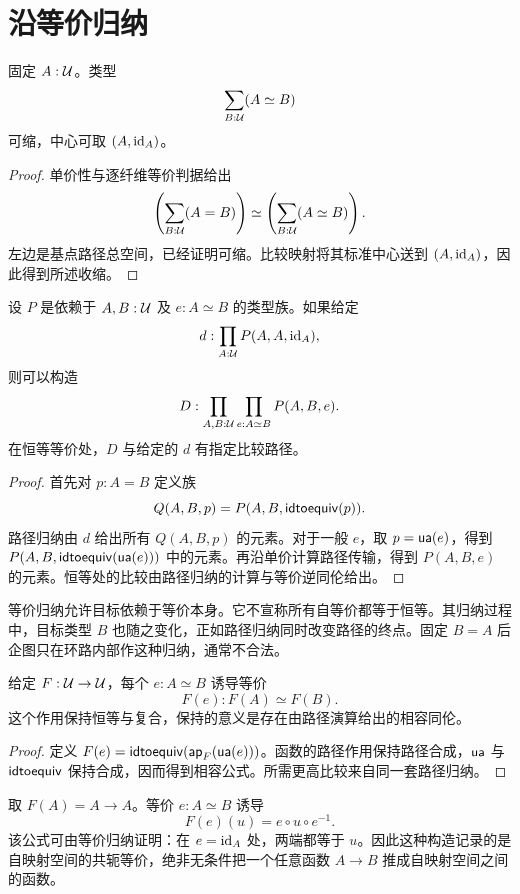 \section{沿等价归纳}
\begin{lemma}[等价总空间可缩]
固定 $A:\mathcal U$。类型
\[
\sum_{B:\mathcal U}(A\simeq B)
\]
可缩，中心可取 $(A,\operatorname{id}_A)$。
\end{lemma}
\begin{proof}
单价性与逐纤维等价判据给出
\[
\left(\sum_{B:\mathcal U}(A=B)\right)
\simeq
\left(\sum_{B:\mathcal U}(A\simeq B)\right).
\]
左边是基点路径总空间，已经证明可缩。比较映射将其标准中心送到 $(A,\operatorname{id}_A)$，因此得到所述收缩。
\end{proof}
\begin{theorem}[等价归纳]
设 $P$ 是依赖于 $A,B:\mathcal U$ 及 $e:A\simeq B$ 的类型族。如果给定
\[
 d:\prod_{A:\mathcal U}P(A,A,\operatorname{id}_A),
\]
则可以构造
\[
 D:\prod_{A,B:\mathcal U}\prod_{e:A\simeq B}P(A,B,e).
\]
在恒等等价处，$D$ 与给定的 $d$ 有指定比较路径。
\end{theorem}
\begin{proof}
首先对 $p:A=B$ 定义族
\[
Q(A,B,p)=P(A,B,\mathsf{idtoequiv}(p)).
\]
路径归纳由 $d$ 给出所有 $Q(A,B,p)$ 的元素。对于一般 $e$，取 $p=\mathsf{ua}(e)$，得到 $P(A,B,\mathsf{idtoequiv}(\mathsf{ua}(e)))$ 中的元素。再沿单价计算路径传输，得到 $P(A,B,e)$ 的元素。恒等处的比较由路径归纳的计算与等价逆同伦给出。
\end{proof}
\begin{remark}
等价归纳允许目标依赖于等价本身。它不宣称所有自等价都等于恒等。其归纳过程中，目标类型 $B$ 也随之变化，正如路径归纳同时改变路径的终点。固定 $B=A$ 后企图只在环路内部作这种归纳，通常不合法。
\end{remark}
\begin{proposition}[可定义构造保持等价]
给定 $F:\mathcal U\to\mathcal U$，每个 $e:A\simeq B$ 诱导等价
\[
F(e):F(A)\simeq F(B).
\]
这个作用保持恒等与复合，保持的意义是存在由路径演算给出的相容同伦。
\end{proposition}
\begin{proof}
定义 $F(e)=\mathsf{idtoequiv}(\mathsf{ap}_F(\mathsf{ua}(e)))$。函数的路径作用保持路径合成，$\mathsf{ua}$ 与 $\mathsf{idtoequiv}$ 保持合成，因而得到相容公式。所需更高比较来自同一套路径归纳。
\end{proof}
\begin{example}
取 $F(A)=A\to A$。等价 $e:A\simeq B$ 诱导
\[
F(e)(u)=e\circ u\circ e^{-1}.
\]
该公式可由等价归纳证明：在 $e=\operatorname{id}_A$ 处，两端都等于 $u$。因此这种构造记录的是自映射空间的共轭等价，绝非无条件把一个任意函数 $A\to B$ 推成自映射空间之间的函数。
\end{example}

